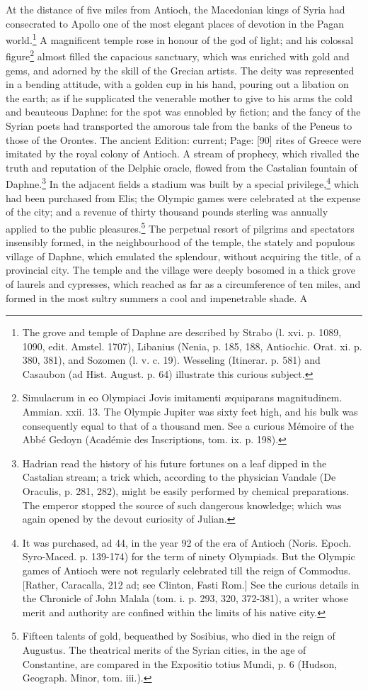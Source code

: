 At the distance of five miles from Antioch, the Macedonian kings of Syria had consecrated to Apollo one of the most elegant places of devotion in the Pagan world.\footnote{The grove and temple of Daphne are described by Strabo (l. xvi. p. 1089, 1090, edit. Amstel. 1707), Libanius (Nenia, p. 185, 188, Antiochic. Orat. xi. p. 380, 381), and Sozomen (l. v. c. 19). Wesseling (Itinerar. p. 581) and Casaubon (ad Hist. August. p. 64) illustrate this curious subject.} A magnificent temple rose in honour of the god of light; and his colossal figure\footnote{Simulacrum in eo Olympiaci Jovis imitamenti æquiparans magnitudinem. Ammian. xxii. 13. The Olympic Jupiter was sixty feet high, and his bulk was consequently equal to that of a thousand men. See a curious Mémoire of the Abbé Gedoyn (Académie des Inscriptions, tom. ix. p. 198).} almost filled the capacious sanctuary, which was enriched with gold and gems, and adorned by the skill of the Grecian artists. The deity was represented in a bending attitude, with a golden cup in his hand, pouring out a libation on the earth; as if he supplicated the venerable mother to give to his arms the cold and beauteous Daphne: for the spot was ennobled by fiction; and the fancy of the Syrian poets had transported the amorous tale from the banks of the Peneus to those of the Orontes. The ancient Edition: current; Page: [90] rites of Greece were imitated by the royal colony of Antioch. A stream of prophecy, which rivalled the truth and reputation of the Delphic oracle, flowed from the Castalian fountain of Daphne.\footnote{Hadrian read the history of his future fortunes on a leaf dipped in the Castalian stream; a trick which, according to the physician Vandale (De Oraculis, p. 281, 282), might be easily performed by chemical preparations. The emperor stopped the source of such dangerous knowledge; which was again opened by the devout curiosity of Julian.} In the adjacent fields a stadium was built by a special privilege,\footnote{It was purchased, ad 44, in the year 92 of the era of Antioch (Noris. Epoch. Syro-Maced. p. 139-174) for the term of ninety Olympiads. But the Olympic games of Antioch were not regularly celebrated till the reign of Commodus. [Rather, Caracalla, 212 ad; see Clinton, Fasti Rom.] See the curious details in the Chronicle of John Malala (tom. i. p. 293, 320, 372-381), a writer whose merit and authority are confined within the limits of his native city.} which had been purchased from Elis; the Olympic games were celebrated at the expense of the city; and a revenue of thirty thousand pounds sterling was annually applied to the public pleasures.\footnote{Fifteen talents of gold, bequeathed by Sosibius, who died in the reign of Augustus. The theatrical merits of the Syrian cities, in the age of Constantine, are compared in the Expositio totius Mundi, p. 6 (Hudson, Geograph. Minor, tom. iii.).} The perpetual resort of pilgrims and spectators insensibly formed, in the neighbourhood of the temple, the stately and populous village of Daphne, which emulated the splendour, without acquiring the title, of a provincial city. The temple and the village were deeply bosomed in a thick grove of laurels and cypresses, which reached as far as a circumference of ten miles, and formed in the most sultry summers a cool and impenetrable shade. A 